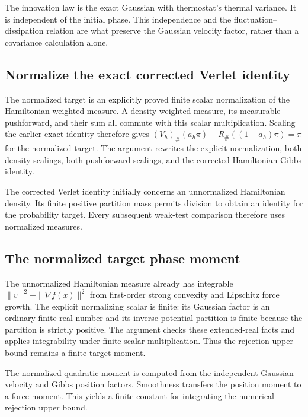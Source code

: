 \documentclass[11pt,a4paper]{report}
\begin{document}
The innovation law is the exact Gaussian with thermostat’s thermal variance. It is independent of the initial phase. This independence and the fluctuation–dissipation relation are what preserve the Gaussian velocity factor, rather than a covariance calculation alone.

\subsection{\texorpdfstring{Normalize the exact corrected Verlet identity}{Normalize the exact corrected Verlet identity}}
\label{report-step-KineticLangevin-SplittingTarget-lean-2}


The normalized target is an explicitly proved finite scalar normalization of the Hamiltonian weighted measure. A density-weighted measure, its measurable pushforward, and their sum all commute with this scalar multiplication. Scaling the earlier exact identity therefore gives \((V_h)_\#(a_h\pi)+R_\#((1-a_h)\pi)=\pi\) for the normalized target. The argument rewrites the explicit normalization, both density scalings, both pushforward scalings, and the corrected Hamiltonian Gibbs identity.



The corrected Verlet identity initially concerns an unnormalized Hamiltonian density. Its finite positive partition mass permits division to obtain an identity for the probability target. Every subsequent weak-test comparison therefore uses normalized measures.

\subsection{\texorpdfstring{The normalized target phase moment}{The normalized target phase moment}}
\label{report-step-KineticLangevin-SplittingTarget-lean-3}


The unnormalized Hamiltonian measure already has integrable \(\|v\|^2+\|\nabla f(x)\|^2\) from first-order strong convexity and Lipschitz force growth. The explicit normalizing scalar is finite: its Gaussian factor is an ordinary finite real number and its inverse potential partition is finite because the partition is strictly positive. The argument checks these extended-real facts and applies integrability under finite scalar multiplication. Thus the rejection upper bound remains a finite target moment.



The normalized quadratic moment is computed from the independent Gaussian velocity and Gibbs position factors. Smoothness transfers the position moment to a force moment. This yields a finite constant for integrating the numerical rejection upper bound.
\end{document}
